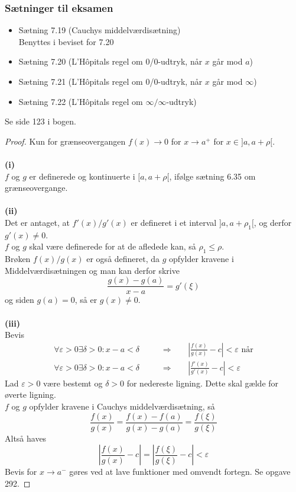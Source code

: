 \subsubsection{Sætninger til eksamen}
\begin{itemize}
\setlength\itemsep{0em}
\item Sætning 7.19 (Cauchys middelværdisætning)\\
Benyttes i beviset for 7.20
\item Sætning 7.20 (L'Hôpitals regel om 0/0-udtryk, når $x$ går mod $a$)
\item Sætning 7.21 (L'Hôpitals regel om 0/0-udtryk, når $x$ går mod $\infty$)
\item Sætning 7.22 (L'Hôpitals regel om $\infty / \infty$-udtryk)
\end{itemize}
\clearpage
\begin{theorem}
Se side 123 i bogen.
\end{theorem}
\begin{proof}
Kun for grænseovergangen $f(x)\to 0$ for $x\to a^+$ for $x\in ]a,a+\rho[$.\\\\
\textbf{(i)}\\
$f$ og $g$ er definerede og kontinuerte i $[a,a+\rho[$, ifølge sætning 6.35 om grænseovergange.\\\\
\textbf{(ii)}\\
Det er antaget, at $f'(x)/g'(x)$ er defineret i et interval $]a,a+\rho_1[$, og derfor $g'(x)\neq 0$.\\
$f$ og $g$ skal være definerede for at de afledede kan, så $\rho_1\leq\rho$.\\
Brøken $f(x)/g(x)$ er også defineret, da $g$ opfylder kravene i Middelværdisætningen og man kan derfor skrive
\begin{equation}
\frac{g(x)-g(a)}{x-a}=g'(\xi)
\end{equation}
og siden $g(a)=0$, så er $g(x)\neq 0$.\\\\
\textbf{(iii)}\\
Bevis
\begin{align}
\forall \varepsilon > 0\exists\delta >0: x-a< \delta\phantom{mm}&\Rightarrow\phantom{mm}\left|\frac{f(x)}{g(x)}-c\right|<\varepsilon\text{ når}\\
\forall \varepsilon > 0\exists\delta >0: x-a< \delta\phantom{mm}&\Rightarrow\phantom{mm}\left|\frac{f'(x)}{g'(x)}-c\right|<\varepsilon
\end{align}
Lad $\varepsilon >0$ være bestemt og $\delta >0$ for nedereste ligning. Dette skal gælde for øverte ligning.\\
$f$ og $g$ opfylder kravene i Cauchys middelværdisætning, så
\begin{equation}
\frac{f(x)}{g(x)}=\frac{f(x)-f(a)}{g(x)-g(a)}=\frac{f(\xi)}{g(\xi)}
\end{equation}
Altså haves
\begin{equation}
\left|\frac{f(x)}{g(x)}-c\right|=\left|\frac{f(\xi)}{g(\xi)}-c\right|<\varepsilon
\end{equation}
Bevis for $x\to a^-$ gøres ved at lave funktioner med omvendt fortegn. Se opgave 292.
\end{proof}
\clearpage
